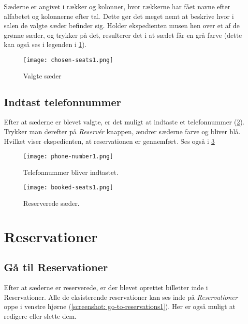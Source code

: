 Sæderne er angivet i rækker og kolonner, hvor rækkerne har fået navne efter alfabetet og kolonnerne efter tal. Dette gør det meget nemt at beskrive hvor i salen de valgte sæder befinder sig. Holder ekspedienten musen hen over et af de grønne sæder, og trykker på det, resulterer det i at sædet får en grå farve (dette kan også ses i legenden i \ref{screenshot: chosen-seats1}).

\begin{figure} [h]
  \centering
  \texttt{[image: chosen-seats1.png]}
  \caption{Valgte sæder}
  \label{screenshot: chosen-seats1}
\end{figure}

\subsection{Indtast telefonnummer}

Efter at sæderne er blevet valgte, er det muligt at indtaste et telefonnummer (\ref{screenshot: phone-number1}). Trykker man derefter på \textit{Reservér} knappen, ændrer sæderne farve og bliver blå. Hvilket viser ekspedienten, at reservationen er gennemført. Ses også i \ref{screenshot: booked-seats1}

\begin{figure} [h]
  \centering
  \texttt{[image: phone-number1.png]}
  \caption{Telefonnummer bliver indtastet.}
  \label{screenshot: phone-number1}
\end{figure}

\begin{figure} [h]
  \centering
  \texttt{[image: booked-seats1.png]}
  \caption{Reserverede sæder.}
  \label{screenshot: booked-seats1}
\end{figure}

\section{Reservationer}

\subsection{Gå til Reservationer}
Efter at sæderne er reserverede, er der blevet oprettet billetter inde i Reservationer. Alle de eksisterende reservationer kan ses inde på \textit{Reservationer} oppe i venstre hjørne (\ref{screenshot: go-to-reservations1}). Her er også muligt at redigere eller slette dem.

